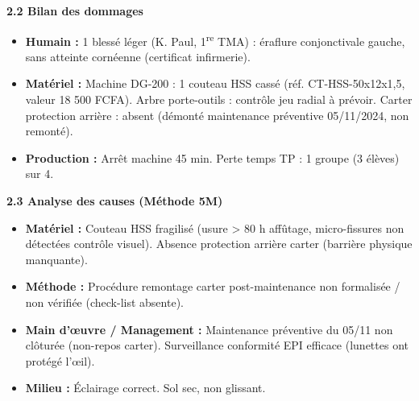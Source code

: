 \documentclass[11pt]{article}
\begin{document}
\begin{corrige}
\textbf{2.2 Bilan des dommages} \\
\begin{itemize}
    \item \textbf{Humain :} 1 blessé léger (K. Paul, 1\textsuperscript{re} TMA) : éraflure conjonctivale gauche, sans atteinte cornéenne (certificat infirmerie).
    \item \textbf{Matériel :} Machine DG-200 : 1 couteau HSS cassé (réf. CT-HSS-50x12x1,5, valeur 18 500 FCFA). Arbre porte-outils : contrôle jeu radial à prévoir. Carter protection arrière : absent (démonté maintenance préventive 05/11/2024, non remonté).
    \item \textbf{Production :} Arrêt machine 45 min. Perte temps TP : 1 groupe (3 élèves) sur 4.
\end{itemize}

\textbf{2.3 Analyse des causes (Méthode 5M)} \\
\begin{itemize}
    \item \textbf{Matériel :} Couteau HSS fragilisé (usure > 80 h affûtage, micro-fissures non détectées contrôle visuel). Absence protection arrière carter (barrière physique manquante).
    \item \textbf{Méthode :} Procédure remontage carter post-maintenance non formalisée / non vérifiée (check-list absente).
    \item \textbf{Main d'œuvre / Management :} Maintenance préventive du 05/11 non clôturée (non-repos carter). Surveillance conformité EPI efficace (lunettes ont protégé l'œil).
    \item \textbf{Milieu :} Éclairage correct. Sol sec, non glissant.
\end{itemize}


\end{corrige}
\end{document}
